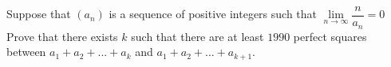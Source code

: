 Suppose that $(a_n)$ is a sequence of positive integers such that $\lim\limits_{n\to \infty} \dfrac{n}{a_n}=0$
Prove that there exists $k$ such that there are at least $1990$ perfect squares between $a_1 + a_2 + ... + a_k$ and $a_1 + a_2 + ... + a_{k+1}$.